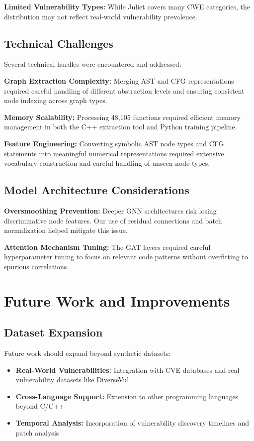 \textbf{Limited Vulnerability Types:} While Juliet covers many CWE categories, the distribution may not reflect real-world vulnerability prevalence.

\subsection{Technical Challenges}

Several technical hurdles were encountered and addressed:

\textbf{Graph Extraction Complexity:} Merging AST and CFG representations required careful handling of different abstraction levels and ensuring consistent node indexing across graph types.

\textbf{Memory Scalability:} Processing 48,105 functions required efficient memory management in both the C++ extraction tool and Python training pipeline.

\textbf{Feature Engineering:} Converting symbolic AST node types and CFG statements into meaningful numerical representations required extensive vocabulary construction and careful handling of unseen node types.

\subsection{Model Architecture Considerations}

\textbf{Oversmoothing Prevention:} Deeper GNN architectures risk losing discriminative node features. Our use of residual connections and batch normalization helped mitigate this issue.

\textbf{Attention Mechanism Tuning:} The GAT layers required careful hyperparameter tuning to focus on relevant code patterns without overfitting to spurious correlations.

\section{Future Work and Improvements}

\subsection{Dataset Expansion}

Future work should expand beyond synthetic datasets:
\begin{itemize}
\item \textbf{Real-World Vulnerabilities:} Integration with CVE databases and real vulnerability datasets like DiverseVul
\item \textbf{Cross-Language Support:} Extension to other programming languages beyond C/C++
\item \textbf{Temporal Analysis:} Incorporation of vulnerability discovery timelines and patch analysis
\end{itemize}

